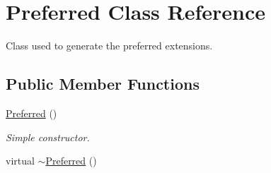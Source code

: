\hypertarget{classPreferred}{\section{Preferred Class Reference}
\label{classPreferred}
}


Class used to generate the preferred extensions.  


\subsection*{Public Member Functions}
\begin{DoxyCompactItemize}
\item 
\hypertarget{classPreferred_af11979bfbee65a273e2f8a0a3112442c}{\hyperlink{classPreferred_af11979bfbee65a273e2f8a0a3112442c}{Preferred} ()}\label{classPreferred_af11979bfbee65a273e2f8a0a3112442c}

\begin{DoxyCompactList}\small\item\em Simple constructor. \end{DoxyCompactList}\item 
\hypertarget{classPreferred_a31af87bcce662056b83c622b31985097}{virtual \hyperlink{classPreferred_a31af87bcce662056b83c622b31985097}{$\sim$\-Preferred} ()}\label{classPreferred_a31af87bcce662056b83c622b31985097}


\end{DoxyCompactItemize}
